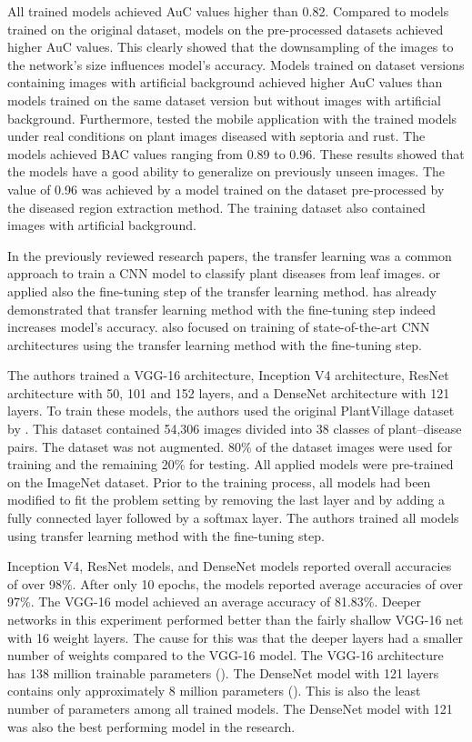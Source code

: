 \documentclass{BachelorBUI}
\begin{document}
        All trained models achieved AuC values higher than 0.82. Compared to models trained on the original dataset, models on the pre-processed datasets achieved higher AuC values. This clearly showed that the downsampling of the images to the network's size influences model's accuracy. Models trained on dataset versions containing images with artificial background achieved higher AuC values than models trained on the same dataset version but without images with artificial background. Furthermore, \textcite{Picon:2019} tested the mobile application with the trained models under real conditions on plant images diseased with septoria and rust. The models achieved BAC values ranging from  0.89 to 0.96. These results showed that the models have a good ability to generalize on previously unseen images. The value of 0.96 was achieved by a model trained on the dataset pre-processed by the diseased region extraction method. The training dataset also contained images with artificial background.

        In the previously reviewed research papers, the transfer learning was a common approach to train a CNN model to classify plant diseases from leaf images. \textcite{Mohanty:2016} or \textcite{Picon:2019} applied also the fine-tuning step of the transfer learning method. \textcite{Mohanty:2016} has already demonstrated that transfer learning method with the fine-tuning step indeed increases model's accuracy. \textcite{Too:2019} also focused on training of state-of-the-art CNN architectures using the transfer learning method with the fine-tuning step.

        The authors trained a VGG-16 architecture, Inception V4 architecture, ResNet architecture with 50, 101 and 152 layers, and a DenseNet architecture with 121 layers. To train these models, the authors used the original PlantVillage dataset by \textcite{Hughes:2015}. This dataset contained 54,306 images divided into 38 classes of plant--disease pairs. The dataset was not augmented. 80\% of the dataset images were used for training and the remaining 20\% for testing. All applied models were pre-trained on the ImageNet dataset. Prior to the training process, all models had been modified to fit the problem setting by removing the last layer and by adding a fully connected layer followed by a softmax layer. The authors trained all models using transfer learning method with the fine-tuning step.

        Inception V4, ResNet models, and DenseNet models reported overall accuracies of over 98\%. After only 10 epochs, the models reported average accuracies of over 97\%. The VGG-16 model achieved an average accuracy of 81.83\%. Deeper networks in this experiment performed better than the fairly shallow VGG-16 net with 16 weight layers. The cause for this was that the deeper layers had a smaller number of weights compared to the VGG-16 model. The VGG-16 architecture has 138 million trainable parameters (\cite{Simonyan:2015}). The DenseNet model with 121 layers contains only approximately 8 million parameters (\cite{Huang:2017}). This is also the least number of parameters among all trained models. The DenseNet model with 121 was also the best performing model in the research.
\end{document}
